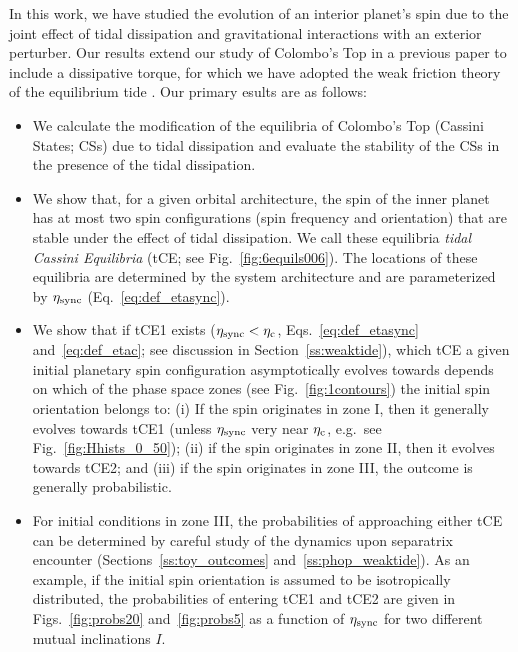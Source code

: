 \documentclass[
        fleqn,
        usenatbib,
    ]{mnras}
\begin{document}
In this work, we have studied the evolution of an interior planet's spin due to
the joint effect of tidal dissipation and gravitational interactions with an
exterior perturber. Our results extend our study of Colombo's Top in a previous
paper \citep{su2020} to include a dissipative torque, for which we have adopted
the weak friction theory of the equilibrium tide \citep{lai2012}. Our primary
esults are as follows:
\begin{itemize}
    \item We calculate the modification of the equilibria of Colombo's Top
        (Cassini States; CSs) due to tidal dissipation and evaluate the
        stability of the CSs in the presence of the tidal dissipation.

    \item We show that, for a given orbital architecture, the spin of the inner
        planet has at most two spin configurations (spin frequency and
        orientation) that are stable under the effect of tidal dissipation. We
        call these equilibria \emph{tidal Cassini Equilibria} (tCE\@; see
        Fig.~\ref{fig:6equils006}). The locations of these equilibria are
        determined by the system architecture and are parameterized by
        $\eta_{\rm sync}$ (Eq.~\ref{eq:def_etasync}).

    \item We show that if tCE1 exists ($\eta_{\rm sync} < \eta_{\rm c}$,
        Eqs.~\ref{eq:def_etasync} and~\ref{eq:def_etac}; see discussion in
        Section~\ref{ss:weaktide}), which tCE a given initial planetary spin
        configuration asymptotically evolves towards depends on which of the
        phase space zones (see Fig.~\ref{fig:1contours}) the initial spin
        orientation belongs to: (i) If the spin originates in zone I, then it
        generally evolves towards tCE1 (unless $\eta_{\rm sync}$ very near
        $\eta_{\rm c}$, e.g.\ see Fig.~\ref{fig:Hhists_0_50}); (ii) if the spin
        originates in zone II, then it evolves towards tCE2; and (iii) if the
        spin originates in zone III, the outcome is generally probabilistic.

    \item For initial conditions in zone III, the probabilities of approaching
        either tCE can be determined by careful study of the dynamics upon
        separatrix encounter (Sections~\ref{ss:toy_outcomes}
        and~\ref{ss:phop_weaktide}). As an example, if the initial spin
        orientation is assumed to be isotropically distributed, the
        probabilities of entering tCE1 and tCE2 are given in
        Figs.~\ref{fig:probs20} and~\ref{fig:probs5} as a function of $\eta_{\rm
        sync}$ for two different mutual inclinations $I$.


\end{itemize}
\end{document}
